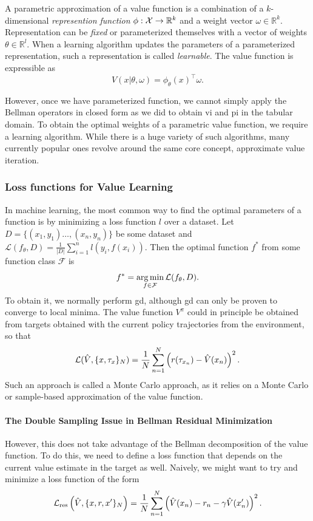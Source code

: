 \begin{definition}
    A parametric approximation of a value function is a combination of a $k$-dimensional \emph{represention function} $\phi: \mathcal{X} \rightarrow \mathbb{R}^k$ and a weight vector $\omega \in \mathbb{R}^k$.
    Representation can be \emph{fixed} or parameterized themselves with a vector of weights $\theta \in \mathbb{R}^l$.
    When a learning algorithm updates the parameters of a parameterized representation, such a representation is called \emph{learnable}.
    The value function is expressible as
    $$V(x|\theta,\omega) = \phi_\theta(x)^\top \omega.$$
\end{definition}

However, once we have parameterized function, we cannot simply apply the Bellman operators in closed form as we did to obtain \ac{vi} and \ac{pi} in the tabular domain.
To obtain the optimal weights of a parametric value function, we require a learning algorithm.
While there is a huge variety of such algorithms, many currently popular ones revolve around the same core concept, approximate value iteration.

\subsubsection{Loss functions for Value Learning}

In machine learning, the most common way to find the optimal parameters of a function is by minimizing a loss function $l$ over a dataset.
Let $D = \{(x_1, y_1) \dots, (x_n, y_n)\}$ be some dataset and $\mathcal{L}(f_\theta,D) = \frac{1}{|D|} \sum_{i=1}^n l(y_i, f(x_i))$.
Then the optimal function $f^*$ from some function class $\mathcal{F}$ is $$f^* = \operatorname*{arg\,min}_{f \in \mathcal{F}} \mathcal{L}(f_\theta,D).$$
To obtain it, we normally perform \ac{gd}, although \ac{gd} can only be proven to converge to local minima.
The value function $V^\pi$ could in principle be obtained from targets obtained with the current policy trajectories from the environment, so that $$\mathcal{L}(\hat{V}, \{x, \tau_{x}\}_N) = \frac{1}{N} \sum_{n=1}^N \left(r(\tau_{x_n}) - \hat{V}(x_n)\right)^2.$$
Such an approach is called a Monte Carlo approach, as it relies on a Monte Carlo or sample-based approximation of the value function.

\paragraph{The Double Sampling Issue in Bellman Residual Minimization}
However, this does not take advantage of the Bellman decomposition of the value function.
To do this, we need to define a loss function that depends on the current value estimate in the target as well.
Naively, we might want to try and minimize a loss function of the form
$$\mathcal{L}_\mathrm{res}\left(\hat{V}, \{x, r, x'\}_{N}\right) = \frac{1}{N} \sum_{n=1}^N \left(\hat{V}(x_n) - r_n - \gamma \hat{V}(x'_n)\right)^2.$$

